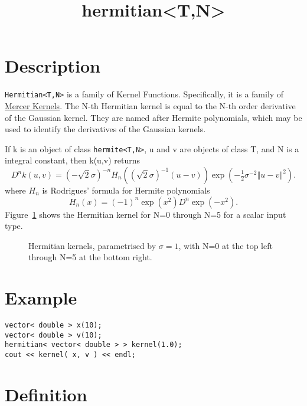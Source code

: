 \documentclass{article}
\newcommand{\half}{\tfrac{1}{2}}
\begin{document}
\title{hermitian<T,N>}
\maketitle

\section*{Description}

\texttt{Hermitian<T,N>} is a family of Kernel Functions. Specifically, it is a family of 
\href{research/kml/documentation/mercer_kernel.html}{Mercer Kernels}. 
The N-th Hermitian kernel is equal to the N-th order derivative of the Gaussian kernel. 
They are named after Hermite polynomials, which may be used to identify the derivatives of the Gaussian kernels. 

If k is an object of class \texttt{hermite<T,N>}, u and v are objects of class T, and N is a integral constant, then k(u,v) returns
%
\begin{equation}
D^{n}k(u,v)=(-\sqrt{2}\sigma)^{-n}H_{n}((\sqrt{2}\sigma)^{-1}(u-v))\exp(-\half\sigma^{-2}\left\Vert u-v\right\Vert^{2}).
\end{equation}
%
where $H_n$ is Rodrigues' formula for Hermite polynomials
\begin{equation}
H_{n}(x)=(-1)^{n}\exp(x^{2})D^{n}\exp(-x^{2}).
\end{equation}
%
Figure~\ref{figure:hermitian_kernel} shows the Hermitian kernel for N=0 through N=5 for a scalar input type.

\begin{figure}
\caption{Hermitian kernels, parametrised by $\sigma=1$, with N=0 at the top left through N=5 at the bottom right.}
\label{figure:hermitian_kernel}
\end{figure}


\section*{Example}


\highlightcpp{}
\begin{verbatim}
vector< double > x(10);
vector< double > v(10);
hermitian< vector< double > > kernel(1.0);
cout << kernel( x, v ) << endl;
\end{verbatim}


\section*{Definition}
\end{document}

